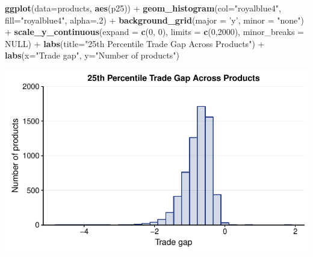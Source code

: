 \documentclass[10pt,]{article}
\newenvironment{Shaded}{\begin{snugshade}}{\end{snugshade}}
\newcommand{\KeywordTok}[1]{\textcolor[rgb]{0.13,0.29,0.53}{\textbf{{#1}}}}
\newcommand{\DataTypeTok}[1]{\textcolor[rgb]{0.13,0.29,0.53}{{#1}}}
\newcommand{\DecValTok}[1]{\textcolor[rgb]{0.00,0.00,0.81}{{#1}}}
\newcommand{\StringTok}[1]{\textcolor[rgb]{0.31,0.60,0.02}{{#1}}}
\newcommand{\OtherTok}[1]{\textcolor[rgb]{0.56,0.35,0.01}{{#1}}}
\newcommand{\NormalTok}[1]{{#1}}
\begin{document}
\begin{Shaded}
\begin{Highlighting}[]
\KeywordTok{ggplot}\NormalTok{(}\DataTypeTok{data=}\NormalTok{products, }\KeywordTok{aes}\NormalTok{(p25)) +}
\StringTok{  }\KeywordTok{geom_histogram}\NormalTok{(}\DataTypeTok{col=}\StringTok{"royalblue4"}\NormalTok{,}
                 \DataTypeTok{fill=}\StringTok{"royalblue4"}\NormalTok{,}
                 \DataTypeTok{alpha=}\NormalTok{.}\DecValTok{2}\NormalTok{) +}
\StringTok{  }\KeywordTok{background_grid}\NormalTok{(}\DataTypeTok{major =} \StringTok{'y'}\NormalTok{, }\DataTypeTok{minor =} \StringTok{"none"}\NormalTok{) +}
\StringTok{  }\KeywordTok{scale_y_continuous}\NormalTok{(}\DataTypeTok{expand =} \KeywordTok{c}\NormalTok{(}\DecValTok{0}\NormalTok{, }\DecValTok{0}\NormalTok{), }\DataTypeTok{limits =} \KeywordTok{c}\NormalTok{(}\DecValTok{0}\NormalTok{,}\DecValTok{2000}\NormalTok{),  }\DataTypeTok{minor_breaks =} \OtherTok{NULL}\NormalTok{) +}
\StringTok{  }\KeywordTok{labs}\NormalTok{(}\DataTypeTok{title=}\StringTok{"25th Percentile Trade Gap Across Products"}\NormalTok{) +}
\StringTok{  }\KeywordTok{labs}\NormalTok{(}\DataTypeTok{x=}\StringTok{"Trade gap"}\NormalTok{, }\DataTypeTok{y=}\StringTok{"Number of products"}\NormalTok{)}
\end{Highlighting}
\end{Shaded}

\begin{center}\includegraphics{Figs/value_time-4} \end{center}
\end{document}
